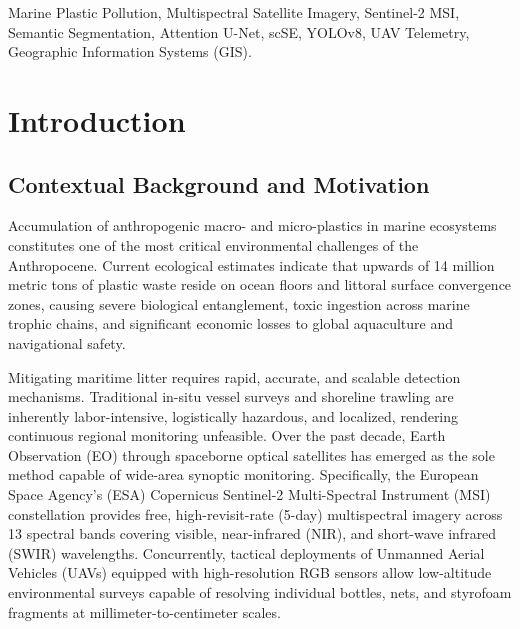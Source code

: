 \documentclass[conference]{IEEEtran}
\begin{document}
\begin{IEEEkeywords}
Marine Plastic Pollution, Multispectral Satellite Imagery, Sentinel-2 MSI, Semantic Segmentation, Attention U-Net, scSE, YOLOv8, UAV Telemetry, Geographic Information Systems (GIS).
\end{IEEEkeywords}

\section{Introduction}

\subsection{Contextual Background and Motivation}
Accumulation of anthropogenic macro- and micro-plastics in marine ecosystems constitutes one of the most critical environmental challenges of the Anthropocene. Current ecological estimates indicate that upwards of 14 million metric tons of plastic waste reside on ocean floors and littoral surface convergence zones, causing severe biological entanglement, toxic ingestion across marine trophic chains, and significant economic losses to global aquaculture and navigational safety. 

Mitigating maritime litter requires rapid, accurate, and scalable detection mechanisms. Traditional in-situ vessel surveys and shoreline trawling are inherently labor-intensive, logistically hazardous, and localized, rendering continuous regional monitoring unfeasible. Over the past decade, Earth Observation (EO) through spaceborne optical satellites has emerged as the sole method capable of wide-area synoptic monitoring. Specifically, the European Space Agency's (ESA) Copernicus Sentinel-2 Multi-Spectral Instrument (MSI) constellation provides free, high-revisit-rate (5-day) multispectral imagery across 13 spectral bands covering visible, near-infrared (NIR), and short-wave infrared (SWIR) wavelengths. Concurrently, tactical deployments of Unmanned Aerial Vehicles (UAVs) equipped with high-resolution RGB sensors allow low-altitude environmental surveys capable of resolving individual bottles, nets, and styrofoam fragments at millimeter-to-centimeter scales.
\end{document}
